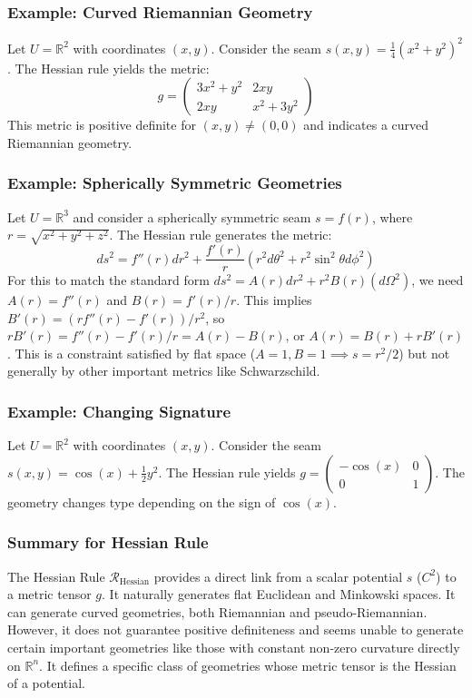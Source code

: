 \documentclass[twoside,twocolumn]{article}
\numberwithin{equation}{section} %
\begin{document}
\subsubsection{Example: Curved Riemannian Geometry}
Let $U = \mathbb{R}^2$ with coordinates $(x, y)$. Consider the seam $s(x, y) = \frac{1}{4} (x^2 + y^2)^2$. The Hessian rule yields the metric:
$$ g = \begin{pmatrix} 3x^2+y^2 & 2xy \\ 2xy & x^2+3y^2 \end{pmatrix} $$
This metric is positive definite for $(x,y) \neq (0,0)$ and indicates a curved Riemannian geometry.

\subsubsection{Example: Spherically Symmetric Geometries}
Let $U = \mathbb{R}^3$ and consider a spherically symmetric seam $s = f(r)$, where $r = \sqrt{x^2+y^2+z^2}$. The Hessian rule generates the metric:
$$ ds^2 = f''(r) dr^2 + \frac{f'(r)}{r} (r^2 d\theta^2 + r^2 \sin^2\theta d\phi^2) $$
For this to match the standard form $ds^2 = A(r) dr^2 + r^2 B(r) (d\Omega^2)$, we need $A(r) = f''(r)$ and $B(r) = f'(r)/r$. This implies $B'(r) = (r f''(r) - f'(r))/r^2$, so $r B'(r) = f''(r) - f'(r)/r = A(r) - B(r)$, or $A(r) = B(r) + r B'(r)$. This is a constraint satisfied by flat space ($A=1, B=1 \implies s=r^2/2$) but not generally by other important metrics like Schwarzschild.

\subsubsection{Example: Changing Signature}
Let $U = \mathbb{R}^2$ with coordinates $(x, y)$. Consider the seam $s(x, y) = \cos(x) + \frac{1}{2} y^2$. The Hessian rule yields $g = \begin{pmatrix} -\cos(x) & 0 \\ 0 & 1 \end{pmatrix}$. The geometry changes type depending on the sign of $\cos(x)$.

\subsubsection{Summary for Hessian Rule}
The Hessian Rule $\mathcal{R}_{\text{Hessian}}$ provides a direct link from a scalar potential $s$ ($C^2$) to a metric tensor $g$. It naturally generates flat Euclidean and Minkowski spaces. It can generate curved geometries, both Riemannian and pseudo-Riemannian. However, it does not guarantee positive definiteness and seems unable to generate certain important geometries like those with constant non-zero curvature directly on $\mathbb{R}^n$. It defines a specific class of geometries whose metric tensor is the Hessian of a potential.
\end{document}
